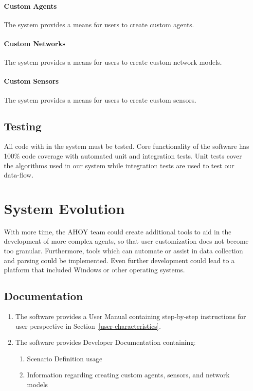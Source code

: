 \documentclass[titlepage]{article}
\begin{document}
    \paragraph{Custom Agents} The system provides a means for users to create custom agents.
    \paragraph{Custom Networks} The system provides a means for users to create custom network models.
    \paragraph{Custom Sensors} The system provides a means for users to create custom sensors.

\subsection{Testing%
    \label{testing}%
}
All code with in the system must be tested. Core functionality of the software has 100\% code coverage with automated unit and integration tests.  Unit tests cover the algorithms used in our system while integration tests are used to test our data-flow.  

\section{System Evolution}

With more time, the AHOY team could create additional tools to aid in the development of more complex agents, so that user customization does not become too granular.  Furthermore, tools which can automate or assist in data collection and parsing could be implemented.  Even further development could lead to a platform that included Windows or other operating systems.


\subsection{Documentation%
  \label{documentation}%
}
\begin{enumerate}
    \item The software provides a User Manual containing step-by-step instructions for user perspective in Section~\ref{user-characteristics}.
    \item The software provides Developer Documentation containing:
    \begin{enumerate}
        \item Scenario Definition usage
        \item Information regarding creating custom agents, sensors, and network models
    \end{enumerate}
\end{enumerate}


\appendix
\pagebreak
\end{document}
